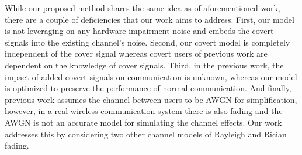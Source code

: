 While our proposed method shares the same idea as of aforementioned work, there are a couple of deficiencies that our work aims to address. First, our model is not leveraging on any hardware impairment noise and embeds the covert signals into the existing channel's noise. Second, our covert model is completely independent of the cover signal whereas covert users of previous work are dependent on the knowledge of cover signals. Third, in the previous work, the impact of added covert signals on communication is unknown, whereas our model is optimized to preserve the performance of normal communication. And finally, previous work assumes the channel between users to be AWGN for simplification, however, in a real wireless communication system there is also fading and the AWGN is not an accurate model for simulating the channel effects. Our work addresses this by considering two other channel models of Rayleigh and Rician fading.